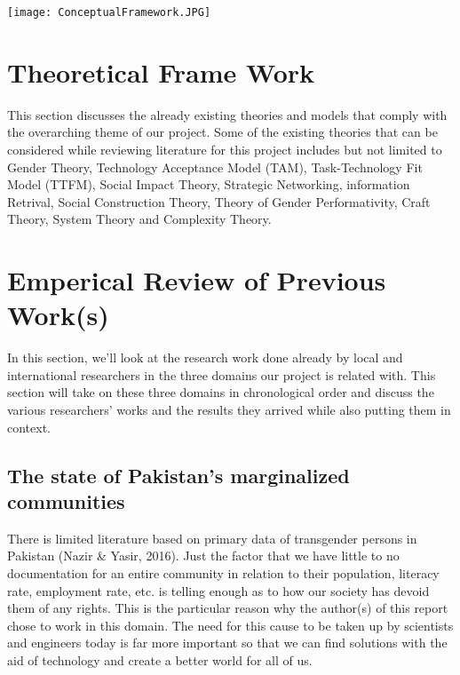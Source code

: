 
\begin{center}
\texttt{[image: ConceptualFramework.JPG]}
\end{center}



\section{Theoretical Frame Work}

This section discusses the already existing theories and models that comply with the overarching theme of our project. Some of the existing theories that can be considered while reviewing literature for this project includes but not limited to Gender Theory, Technology Acceptance Model (TAM), Task-Technology Fit Model (TTFM), Social Impact Theory, Strategic Networking, information Retrival, Social Construction Theory, Theory of Gender Performativity, Craft Theory, System Theory and Complexity Theory.

\section{Emperical Review of Previous Work(s)}

In this section, we'll look at the research work done already by local and international researchers in the three domains our project is related with. This section will take on these three domains in chronological order and discuss the various researchers' works  and the results they arrived while also putting them in context.

\subsection{The state of Pakistan's marginalized communities}

There is limited literature based on primary data of transgender persons in Pakistan (Nazir \& Yasir, 2016). Just the factor that we have little to no documentation for an entire community in relation to their population, literacy rate, employment rate, etc. is telling enough as to how our society has devoid them of any rights. This is the particular reason why the author(s) of this report chose to work in this domain. The need for this cause to be taken up by scientists and engineers today is far more important so that we can find solutions with the aid of technology and create a better world for all of us. 

